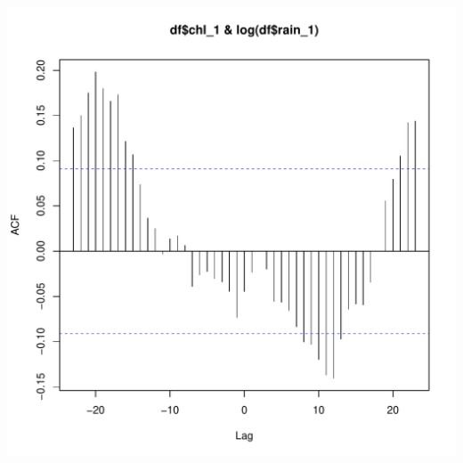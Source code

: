 \documentclass{article}\usepackage[]{graphicx}\usepackage[]{color}
\makeatletter
\def\maxwidth{ %
  \ifdim\Gin@nat@width>\linewidth
    \linewidth
  \else
    \Gin@nat@width
  \fi
}
\newenvironment{knitrout}{}{} %
\makeatother
\begin{document}
\begin{knitrout}
\includegraphics[width=\maxwidth]{figure/unnamed-chunk-23-2} 

\end{knitrout}
\end{document}

